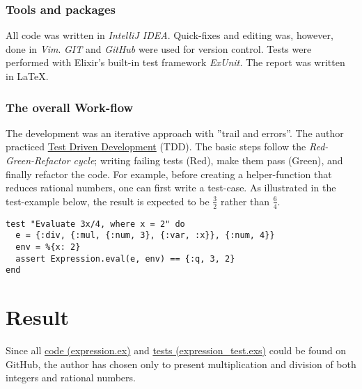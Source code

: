\documentclass[a4paper,11pt]{article}
\begin{document}
\subsubsection*{Tools and packages}
\label{subsec:tools}
All code was written in \emph{IntelliJ IDEA}.
Quick-fixes and editing was, however, done in \emph{Vim}.
\emph{GIT} and \emph{GitHub} were used for version control.
Tests were performed with Elixir's built-in test framework \emph{ExUnit.}
The report was written in \LaTeX.
\subsubsection*{The overall Work-flow}
\label{subsec:workflow}
The development was an iterative approach with ''trail and errors''.
The author practiced
\href{https://www.elixirwiki.com/wiki/Test-Driven_Development_in_Elixir}{Test Driven Development}
(TDD).
The basic steps follow the \emph{Red-Green-Refactor cycle};
writing failing tests (Red), make them pass (Green),
and finally refactor the code.
For example, before creating a helper-function that reduces rational numbers,
one can first write a test-case.
As illustrated in the test-example below, the result is expected to be
$\frac{3}{2}$ rather than $\frac{6}{4}$.
\begin{verbatim}
test "Evaluate 3x/4, where x = 2" do
  e = {:div, {:mul, {:num, 3}, {:var, :x}}, {:num, 4}}
  env = %{x: 2}
  assert Expression.eval(e, env) == {:q, 3, 2}
end
\end{verbatim}
\section*{Result}
\label{sec:result}
Since all
\href{https://github.com/VincentFerrigan/kth-id1019-programming-ii/tree/main/tasks/3/expression/lib/expression}{code (expression.ex)} and %
\href{https://github.com/VincentFerrigan/kth-id1019-programming-ii/tree/main/tasks/3/expression/test/expression_test.exs}{tests (expression\_test.exs)}
could be found on GitHub, the author has chosen only to present multiplication and division
of both integers and rational numbers.
\end{document}
